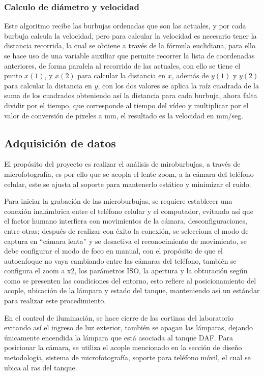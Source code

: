 \documentclass[12pt,twocolumn,a4paper]{article}
\begin{document}
\subsubsection{Calculo de diámetro y velocidad }

Este algoritmo recibe las burbujas ordenadas que son las actuales, y por cada burbuja calcula la velocidad, pero para calcular la velocidad es necesario tener la distancia recorrida, la cual se obtiene a través de la fórmula euclidiana, para ello se hace uso de una variable auxiliar que permite recorrer la lista de coordenadas anteriores, de forma paralela al recorrido de las actuales, con ello se tiene el  punto $x(1)$, y $x(2)$ para calcular la distancia en $x$, además de $y(1)$ y $y(2)$ para calcular la distancia en $y$, con los dos valores se aplica la raíz cuadrada de la suma de los cuadrados obteniendo así la distancia para cada burbuja, ahora falta dividir por el tiempo, que corresponde al tiempo del vídeo y multiplicar por el valor de conversión de pixeles a mm, el resultado es la velocidad en mm/seg.


\subsection{Adquisición de datos}

El propósito del proyecto es realizar el análisis de miroburbujas, a través de microfotografía, es por ello que se acopla el lente zoom, a la cámara del teléfono celular, este se ajusta al soporte para mantenerlo estático y minimizar el ruido.

Para iniciar la grabación de las microburbujas, se requiere establecer una conexión inalámbrica entre el teléfono celular y el computador, evitando así que el factor humano interfiera  con movimientos de la cámara, desconfiguraciones, entre otras; después de realizar con éxito la conexión,  se selecciona el modo de captura en “cámara lenta” y se desactiva el reconocimiento de movimiento, se debe configurar el modo de foco en manual, con el propósito de que el autoenfoque no vaya cambiando entre las cámaras del teléfono, también se configura el zoom a x2, los parámetros ISO, la apertura y la obturación según como se presenten las condiciones del entorno, esto refiere al posicionamiento del acople, ubicación de la lámpara y estado del tanque, manteniendo así un estándar para realizar este procedimiento.

En el control de iluminación, se hace cierre de las cortinas del laboratorio evitando así el ingreso de luz exterior, también se apagan las lámparas, dejando únicamente encendida la lámpara que está asociada al tanque DAF. Para posicionar la cámara, 
se utiliza el acople mencionado en la sección de diseño metodología, sistema de microfotografía, soporte para teléfono móvil, el cual se ubica al ras del tanque.
\end{document}
